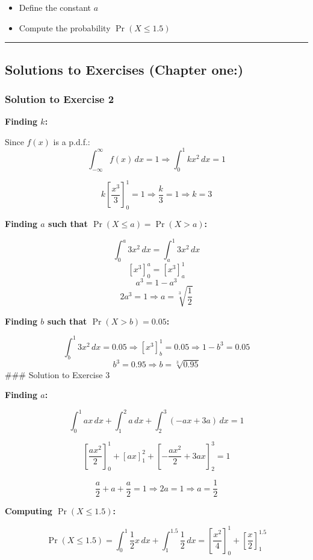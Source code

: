 \documentclass[
]{article}
\providecommand{\tightlist}{%
  \setlength{\itemsep}{0pt}\setlength{\parskip}{0pt}}
\begin{document}
\begin{itemize}
\tightlist
\item
  Define the constant \(a\)
\item
  Compute the probability \(\Pr(X \leq 1.5)\)
\end{itemize}

\begin{center}\rule{0.5\linewidth}{0.5pt}\end{center}

\subsection{Solutions to Exercises (Chapter
one:)}\label{solutions-to-exercises-chapter-one}

\subsubsection{Solution to Exercise 2}\label{solution-to-exercise-2}

\textbf{Finding \(k\):}

Since \(f(x)\) is a p.d.f.:
\[\int_{-\infty}^{\infty} f(x)\,dx = 1 \Rightarrow \int_{0}^{1} kx^2\,dx = 1\]

\[k\left[\frac{x^3}{3}\right]_0^1 = 1 \Rightarrow \frac{k}{3} = 1 \Rightarrow k = 3\]

\textbf{Finding \(a\) such that \(\Pr(X \leq a) = \Pr(X > a)\):}

\[\int_0^a 3x^2\,dx = \int_a^1 3x^2\,dx\] \[[x^3]_0^a = [x^3]_a^1\]
\[a^3 = 1 - a^3\] \[2a^3 = 1 \Rightarrow a = \sqrt[3]{\frac{1}{2}}\]

\textbf{Finding \(b\) such that \(\Pr(X > b) = 0.05\):}

\[\int_b^1 3x^2\,dx = 0.05 \Rightarrow \left[x^3\right]_b^1 = 0.05 \Rightarrow 1 - b^3 = 0.05\]
\[b^3 = 0.95 \Rightarrow b = \sqrt[3]{0.95}\] \#\#\# Solution to
Exercise 3

\textbf{Finding \(a\):}

\[\int_0^1 ax\,dx + \int_1^2 a\,dx + \int_2^3(-ax+3a)\,dx = 1\]

\[\left[\frac{ax^2}{2}\right]_0^1 + [ax]_1^2 + \left[-\frac{ax^2}{2}+3ax\right]_2^3 = 1\]

\[\frac{a}{2} + a + \frac{a}{2} = 1 \Rightarrow 2a = 1 \Rightarrow a = \frac{1}{2}\]

\textbf{Computing \(\Pr(X \leq 1.5)\):}

\[\Pr(X \leq 1.5) = \int_0^1 \frac{1}{2}x\,dx + \int_1^{1.5}\frac{1}{2}\,dx = \left[\frac{x^2}{4}\right]_0^1 + \left[\frac{x}{2}\right]_1^{1.5}\]
\end{document}

